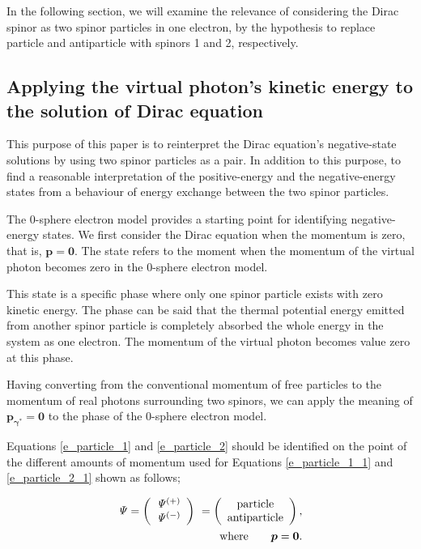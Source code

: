 \documentclass[%
 reprint,
 amsmath,amssymb,
 aps,
]{revtex4-1}
\numberwithin{equation}{section}%
\begin{document}
    In the following section, we will examine the relevance of considering the Dirac spinor as two spinor particles in one electron, by the hypothesis to replace particle and antiparticle with spinors 1 and 2, respectively.



\subsection{
    \label{sec:Applying the virtual photon's kinetic energy to the solution of Dirac equation}
        Applying the virtual photon's kinetic energy to the solution of Dirac equation}


    This purpose of this paper is to reinterpret the Dirac equation's negative-state solutions by using two spinor particles as a pair. In addition to this purpose, to find a reasonable interpretation of the positive-energy and the negative-energy states from a behaviour of energy exchange between the two spinor particles. 

    The 0-sphere electron model provides a starting point for identifying negative-energy states. We first consider the Dirac equation when the momentum is zero, that is, $ \bm{p} = \bm{0} $. The state refers to the moment when the momentum of the virtual photon becomes zero in the 0-sphere electron model.
    
    This state is a specific phase where only one spinor particle exists with zero kinetic energy. The phase can be said that the thermal potential energy emitted from another spinor particle is completely absorbed the whole energy in the system as one electron. The momentum of the virtual photon becomes value zero at this phase.
    
    Having converting from the conventional momentum of free particles to the momentum of real photons surrounding two spinors, we can apply the meaning of $ \bm{p_{\gamma^{*}}} = \bm{0} $ to the phase of the 0-sphere electron model.


    Equations \ref{e_particle_1} and \ref{e_particle_2} should be identified on the point of the different amounts of momentum used for Equations \ref{e_particle_1_1} and \ref{e_particle_2_1} shown as follows;

    
        \begin{align}
            \it\Psi =
                \left( 
                    \begin{array}{c}
                        \it\Psi^{(+)} \\ \it\Psi^{(-)}
                    \end{array}
                \right) \
            =
                \left(
                    \begin{array}{c}
                        \mathrm{particle} \\ \mathrm{antiparticle}
                    \end{array}
                \right)
                ,
            \notag
            \\
            \mathrm{where} \ \ \ \ \ \ \bm{p} = \bm{0}
            .
        \label{e_particle_1_1}
        \end{align}    
\end{document}
